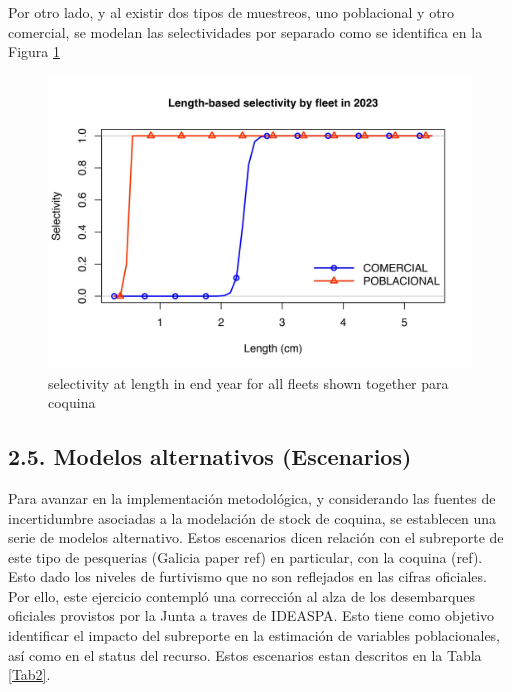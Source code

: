 \documentclass[
]{article}
\begin{document}
Por otro lado, y al existir dos tipos de muestreos, uno poblacional y otro comercial, se modelan las selectividades por separado como se identifica en la Figura \ref{fig:sel}

\begin{figure}[H]

{\centering \includegraphics[width=0.8\linewidth]{Dtrunculus_SS3_2024_files/figure-latex/sel-1} 

}

\caption{\label{sel}selectivity at length in end year for all fleets shown together para coquina}\label{fig:sel}
\end{figure}

\hypertarget{modelos-alternativos-escenarios}{%
\subsection{2.5. Modelos alternativos (Escenarios)}\label{modelos-alternativos-escenarios}}

Para avanzar en la implementación metodológica, y considerando las fuentes de incertidumbre asociadas a la modelación de stock de coquina, se establecen una serie de modelos alternativo. Estos escenarios dicen relación con el subreporte de este tipo de pesquerias (Galicia paper ref) en particular, con la coquina (ref). Esto dado los niveles de furtivismo que no son reflejados en las cifras oficiales. Por ello, este ejercicio contempló una corrección al alza de los desembarques oficiales provistos por la Junta a traves de IDEASPA. Esto tiene como objetivo identificar el impacto del subreporte en la estimación de variables poblacionales, así como en el status del recurso. Estos escenarios estan descritos en la Tabla \ref{Tab2}.
\end{document}
